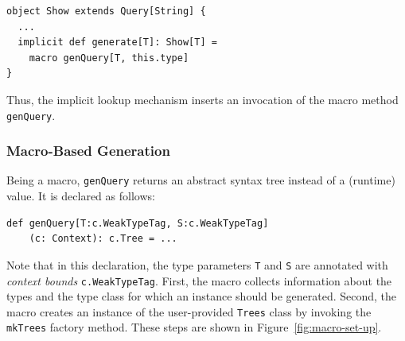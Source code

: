 \documentclass[preprint,nocopyrightspace]{sigplanconf}
\begin{document}
\begin{lstlisting}
object Show extends Query[String] {
  ...
  implicit def generate[T]: Show[T] =
    macro genQuery[T, this.type]
}
\end{lstlisting}
\noindent
Thus, the implicit lookup mechanism inserts an invocation of the macro method
\verb|genQuery|.

\subsubsection{Macro-Based Generation}
\label{sec:macro-based-generation}

Being a macro, \verb|genQuery| returns an abstract syntax
tree instead of a (runtime) value. It is declared as follows:

\begin{lstlisting}
def genQuery[T:c.WeakTypeTag, S:c.WeakTypeTag]
    (c: Context): c.Tree = ...
\end{lstlisting}
\noindent
Note that in this declaration, the type parameters \verb|T| and \verb|S| are annotated with
\emph{context bounds} \verb|c.WeakTypeTag|.
%
First, the macro collects information about the types and the type
class for which an instance should be generated. Second, the macro creates an
instance of the user-provided \verb|Trees| class by invoking the
\verb|mkTrees| factory method. These steps are shown in Figure~\ref{fig:macro-set-up}.
\end{document}
